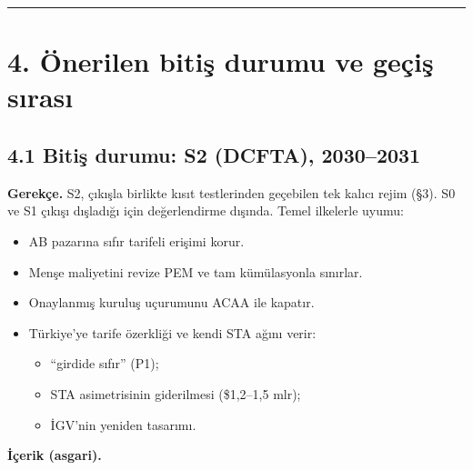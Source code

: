 \begin{center}\rule{0.5\linewidth}{0.5pt}\end{center}

\hypertarget{02b_secenekler_hukuk-4-uxf6nerilen-bitiux15f-durumu-ve-geuxe7iux15f-sux131rasux131}{%
\section{4. Önerilen bitiş durumu ve geçiş sırası}\label{02b_secenekler_hukuk-4-uxf6nerilen-bitiux15f-durumu-ve-geuxe7iux15f-sux131rasux131}}

\hypertarget{02b_secenekler_hukuk-41-bitiux15f-durumu-s2-dcfta-20302031}{%
\subsection{4.1 Bitiş durumu: S2 (DCFTA), 2030--2031}\label{02b_secenekler_hukuk-41-bitiux15f-durumu-s2-dcfta-20302031}}

\textbf{Gerekçe.} S2, çıkışla birlikte kısıt testlerinden geçebilen tek kalıcı rejim (§3). S0 ve S1 çıkışı dışladığı için değerlendirme dışında. Temel ilkelerle uyumu:

\begin{itemize}
\tightlist
\item
  AB pazarına sıfır tarifeli erişimi korur.
\item
  Menşe maliyetini revize PEM ve tam kümülasyonla sınırlar.
\item
  Onaylanmış kuruluş uçurumunu ACAA ile kapatır.
\item
  Türkiye'ye tarife özerkliği ve kendi STA ağını verir:

  \begin{itemize}
  \tightlist
  \item
    ``girdide sıfır'' (P1);
  \item
    STA asimetrisinin giderilmesi (\$1,2--1,5 mlr);
  \item
    İGV'nin yeniden tasarımı.
  \end{itemize}
\end{itemize}

\textbf{İçerik (asgari).}

